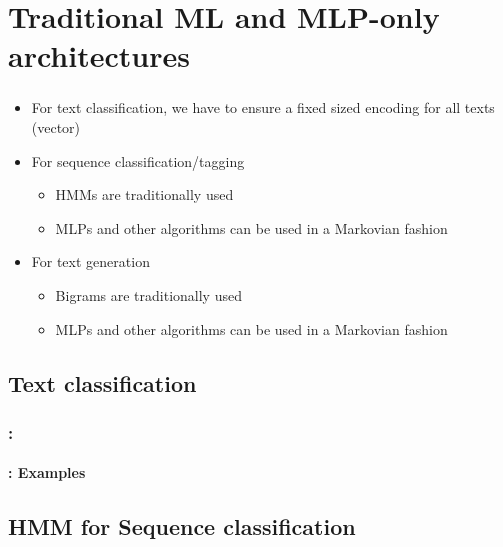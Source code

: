 \documentclass[xcolor=table]{beamer}
\begin{document}
\section{Traditional ML and MLP-only architectures}

\begin{frame}
	\frametitle{\insertshortsubtitle}
	\framesubtitle{\insertsection}
	
	\begin{itemize}
		\item For text classification, we have to ensure a fixed sized encoding for all texts (vector)
		\item For sequence classification/tagging
		\begin{itemize}
			\item HMMs are traditionally used
			\item MLPs and other algorithms can be used in a Markovian fashion 
		\end{itemize}
		\item For text generation
		\begin{itemize}
			\item Bigrams are traditionally used
			\item MLPs and other algorithms can be used in a Markovian fashion 
		\end{itemize}
	\end{itemize}
	
\end{frame}


\subsection{Text classification}

\begin{frame}
	\frametitle{\insertshortsubtitle: \insertsection}
	\framesubtitle{\insertsubsection: Examples}
	
	
\end{frame}

\subsection{HMM for Sequence classification}
\end{document}
